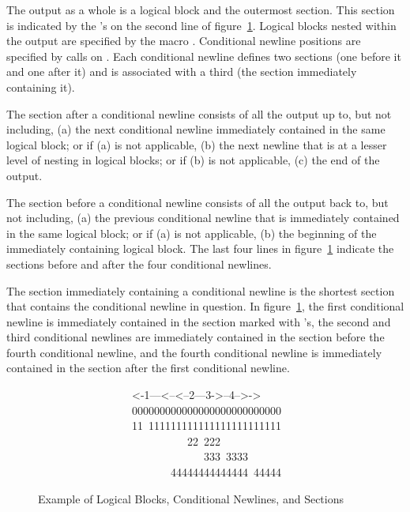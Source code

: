 The output as a whole is a logical block and the outermost section.  This
section is indicated by the 's on the second line of
figure~\ref{PRETTY-PRINT-SECTIONS-FIGURE}.  Logical blocks nested within
the output are specified by the macro
.  Conditional newline positions are specified by calls
on .  Each conditional newline defines two sections (one
before it and one after it) and is associated with a third (the section
immediately containing it).

The section after a conditional newline consists of all the output up to,
but not including, (a) the next conditional newline immediately contained
in the same logical block; or if (a) is not applicable, (b) the next
newline that is at a lesser level of nesting in logical blocks; or if (b)
is not applicable, (c) the end of the output.

The section before a conditional newline consists of all the output back
to, but not including, (a) the previous conditional newline that is
immediately contained in the same logical block; or if (a) is not
applicable, (b) the beginning of the immediately containing logical block.
The last four lines in figure~\ref{PRETTY-PRINT-SECTIONS-FIGURE} indicate
the sections before and after the four conditional newlines.

The section immediately containing a conditional newline is the shortest
section that contains the conditional newline in question.  In
figure~\ref{PRETTY-PRINT-SECTIONS-FIGURE}, the first conditional newline is
immediately contained in the section marked with 's, the second and third
conditional newlines are immediately contained in the section before the
fourth conditional newline, and the fourth conditional newline is
immediately contained in the section after the first conditional newline.

\begin{figure}[t]
\caption{Example of Logical Blocks, Conditional Newlines, and Sections}
\label{PRETTY-PRINT-SECTIONS-FIGURE}
\begin{lisp}
~~~~~~~~~~~~~~~~~<-1---<--<--2---3->--4-->-> \\[4pt]
~~~~~~~~~~~~~~~~~000000000000000000000000000 \\
~~~~~~~~~~~~~~~~~11~111111111111111111111111 \\
~~~~~~~~~~~~~~~~~~~~~~~~~~~22~222            \\
~~~~~~~~~~~~~~~~~~~~~~~~~~~~~~333~3333       \\
~~~~~~~~~~~~~~~~~~~~~~~~44444444444444~44444
\end{lisp}
\end{figure}

